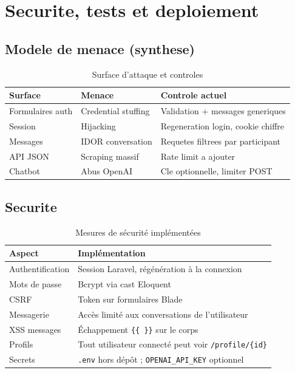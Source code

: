 \chapter{Securite, tests et deploiement}
\label{ch:sec}

\section{Modele de menace (synthese)}

\begin{table}[H]
\centering
\caption{Surface d'attaque et controles}
\begin{tabular}{@{}lll@{}}
\toprule
\textbf{Surface} & \textbf{Menace} & \textbf{Controle actuel} \\
\midrule
Formulaires auth & Credential stuffing & Validation + messages generiques \\
Session & Hijacking & Regeneration login, cookie chiffre \\
Messages & IDOR conversation & Requetes filtrees par participant \\
API JSON & Scraping massif & Rate limit a ajouter \\
Chatbot & Abus OpenAI & Cle optionnelle, limiter POST \\
\bottomrule
\end{tabular}
\end{table}

\section{Securite}

\begin{table}[H]
\centering
\caption{Mesures de sécurité implémentées}
\begin{tabular}{@{}lp{9cm}@{}}
\toprule
\textbf{Aspect} & \textbf{Implémentation} \\
\midrule
Authentification & Session Laravel, régénération à la connexion \\
Mots de passe & Bcrypt via cast Eloquent \\
CSRF & Token sur formulaires Blade \\
Messagerie & Accès limité aux conversations de l'utilisateur \\
XSS messages & Échappement \texttt{\{\{ \}\}} sur le corps \\
Profils & Tout utilisateur connecté peut voir \texttt{/profile/\{id\}} \\
Secrets & \texttt{.env} hors dépôt ; \texttt{OPENAI\_API\_KEY} optionnel \\
\bottomrule
\end{tabular}
\end{table}

